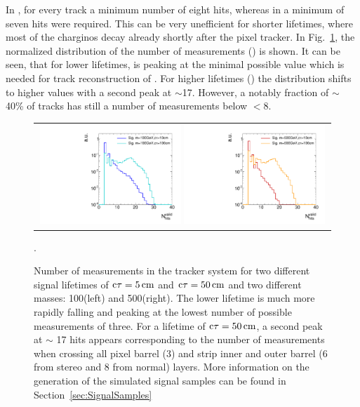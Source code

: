 In \cite{bib:CMS:HSCP_8TeV}, for every track a minimum number of eight hits, whereas in \cite{bib:CMS:DT_8TeV} a minimum of seven hits were required. 
This can be very unefficient for shorter lifetimes, where most of the charginos decay already shortly after the pixel tracker.
In Fig.~\ref{fig:NHits_2Signal_noSelection_normalized}, the normalized distribution of the number of measurements (\nhits) is shown. 
It can be seen, that for lower lifetimes, \nhits is peaking at the minimal possible value which is needed for track reconstruction of .
For higher lifetimes (\cm) the distribution shifts to higher values with a second peak at \nhits$\sim$17.
However, a notably fraction of $\sim$ 40\% of tracks has still a number of measurements below \nhits$<$8. 
\begin{figure}[!bt]
  \centering 
  \begin{tabular}{c}
  \includegraphics[width=0.49\textwidth]{figures/analysis/htrackNValid_log_chiTracksnoSelection_m100GeV.pdf}
  \includegraphics[width=0.49\textwidth]{figures/analysis/htrackNValid_log_chiTracksnoSelection_m500GeV.pdf}
  \end{tabular}
  \caption{Number of measurements in the tracker system \nhits for two different signal lifetimes of $\text{c}\tau=5\,\text{cm}$ and $\text{c}\tau=50\,\text{cm}$ and two different masses: 100\gev (left) and 500\gev (right). 
           The lower lifetime is much more rapidly falling and peaking at the lowest number of possible measurements of three. 
           For a lifetime of $\text{c}\tau=50\,\text{cm}$, a second peak at $\sim$ 17 hits appears corresponding to the number of measurements when crossing all pixel barrel (3) and strip inner and outer barrel (6 from stereo and 8 from normal) layers.
           More information on the generation of the simulated signal samples can be found in Section~\ref{sec:SignalSamples}}. 
  \label{fig:NHits_2Signal_noSelection_normalized}
\end{figure}

